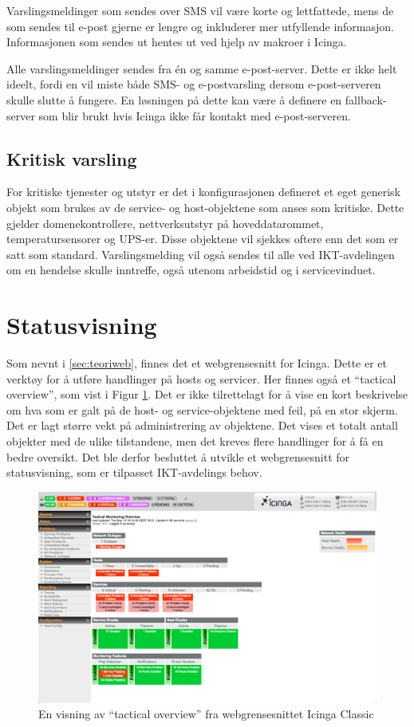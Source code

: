 Varslingsmeldinger som sendes over SMS vil være korte og lettfattede, mens de som sendes til e-post gjerne er lengre og inkluderer mer utfyllende informasjon. Informasjonen som sendes ut hentes ut ved hjelp av makroer i Icinga\cite{icingamacro}.

Alle varslingsmeldinger sendes fra én og samme e-post-server. Dette er ikke helt ideelt, fordi en vil miste både SMS- og e-postvarsling dersom e-post-serveren skulle slutte å fungere. En løsningen på dette kan være å definere en fallback-server som blir brukt hvis Icinga ikke får kontakt med e-post-serveren. 

\subsection{Kritisk varsling}
For kritiske tjenester og utstyr er det i konfigurasjonen defineret et eget generisk objekt som brukes av de service- og host-objektene som anses som kritiske. Dette gjelder domenekontrollere, nettverksutstyr på hoveddatarommet, temperatursensorer og UPS-er. Disse objektene vil sjekkes oftere enn det som er satt som standard. Varslingsmelding vil også sendes til alle ved IKT-avdelingen om en hendelse skulle inntreffe, også utenom arbeidstid og i servicevinduet.

\section{Statusvisning}
Som nevnt i \ref{sec:teoriweb}, finnes det et webgrensesnitt for Icinga. Dette er et verktøy for å utføre handlinger på hosts og servicer. Her finnes også et ``tactical overview'', som vist i Figur \ref{icingawebgui}. Det er ikke tilrettelagt for å vise en kort beskrivelse om hva som er galt på de host- og service-objektene med feil, på en stor skjerm. Det er lagt større vekt på administrering av objektene. Det vises et totalt antall objekter med de ulike tilstandene, men det kreves flere handlinger for å få en bedre oversikt. Det ble derfor besluttet å utvikle et webgrensesnitt for statusvisning, som er tilpasset IKT-avdelings behov.
\begin{figure}
	\centering
    \includegraphics[width=1.0\textwidth]{img/icinga_tactical}
    \caption{En visning av ``tactical overview'' fra webgrensesnittet Icinga Classic}
    \label{icingawebgui}
\end{figure}

